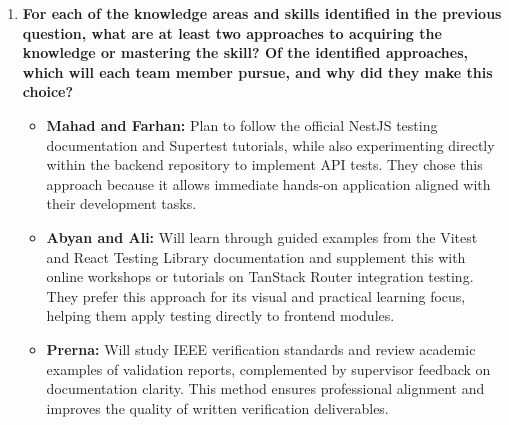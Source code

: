 \documentclass[12pt, titlepage]{article}
\begin{document}
\begin{enumerate}
  \item \textbf{For each of the knowledge areas and skills identified in the previous question, what are at least two approaches to acquiring the knowledge or mastering the skill? Of the identified approaches, which will each team member pursue, and why did they make this choice?} \\[3pt]
  \begin{itemize}
    \item \textbf{Mahad and Farhan:} Plan to follow the official NestJS testing documentation and Supertest tutorials, while also experimenting directly within the backend repository to implement API tests. They chose this approach because it allows immediate hands-on application aligned with their development tasks.
    \item \textbf{Abyan and Ali:} Will learn through guided examples from the Vitest and React Testing Library documentation and supplement this with online workshops or tutorials on TanStack Router integration testing. They prefer this approach for its visual and practical learning focus, helping them apply testing directly to frontend modules.
    \item \textbf{Prerna:} Will study IEEE verification standards and review academic examples of validation reports, complemented by supervisor feedback on documentation clarity. This method ensures professional alignment and improves the quality of written verification deliverables.
  \end{itemize}
\end{enumerate}
\end{document}
